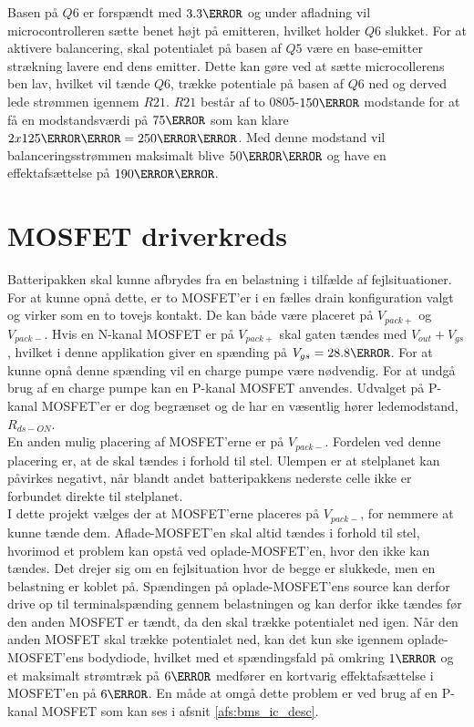 Basen på $Q6$ er forspændt med $3.3\volt$ og under afladning vil microcontrolleren sætte benet højt på emitteren, hvilket holder $Q6$ slukket. For at aktivere balancering, skal potentialet på basen af $Q5$ være en base-emitter strækning lavere end dens emitter. Dette kan gøre ved at sætte microcollerens ben lav, hvilket vil tænde $Q6$, trække potentiale på basen af $Q6$ ned og derved lede strømmen igennem $R21$. $R21$ består af to 0805-$150\ohm$ modstande for at få en modstandsværdi på $75\ohm$ som kan klare $2 x 125\milli\watt = 250\milli\watt$. Med denne modstand vil balanceringsstrømmen maksimalt blive $50\milli\ampere$ og have en effektafsættelse på $190\milli\watt$.

\section{MOSFET driverkreds}
Batteripakken skal kunne afbrydes fra en belastning i tilfælde af fejlsituationer. For at kunne opnå dette, er to MOSFET'er i en fælles drain konfiguration valgt og virker som en to tovejs kontakt. De kan både være placeret på $V_{pack+}$ og $V_{pack-}$. Hvis en N-kanal MOSFET er på $V_{pack+}$ skal gaten tændes med $V_{out} + V_{gs}$, hvilket i denne applikation giver en spænding på $V_{gs} = 28.8\volt$. For at kunne opnå denne spænding vil en charge pumpe være nødvendig. For at undgå brug af en charge pumpe kan en P-kanal MOSFET anvendes. Udvalget på P-kanal MOSFET'er er dog begrænset og de har en væsentlig hører ledemodstand, $R_{ds-ON}$. 
\\

En anden mulig placering af MOSFET'erne er på $V_{pack-}$. Fordelen ved denne placering er, at de skal tændes i forhold til stel. Ulempen er at stelplanet kan påvirkes negativt, når blandt andet batteripakkens nederste celle ikke er forbundet direkte til stelplanet.
\\

I dette projekt vælges der at MOSFET'erne placeres på $V_{pack-}$, for nemmere at kunne tænde dem. Aflade-MOSFET'en skal altid tændes i forhold til stel, hvorimod et problem kan opstå ved oplade-MOSFET'en, hvor den ikke kan tændes. Det drejer sig om en fejlsituation hvor de begge er slukkede, men en belastning er koblet på. Spændingen på oplade-MOSFET'ens source kan derfor drive op til terminalspænding gennem belastningen og kan derfor ikke tændes før den anden MOSFET er tændt, da den skal trække potentialet ned igen. Når den anden MOSFET skal trække potentialet ned, kan det kun ske igennem oplade-MOSFET'ens bodydiode, hvilket med et spændingsfald på omkring $1\volt$ og et maksimalt strømtræk på $6\ampere$ medfører en kortvarig effektafsættelse i MOSFET'en på $6\watt$. En måde at omgå dette problem er ved brug af en P-kanal MOSFET som kan ses i afsnit \ref{afs:bms_ic_desc}.


